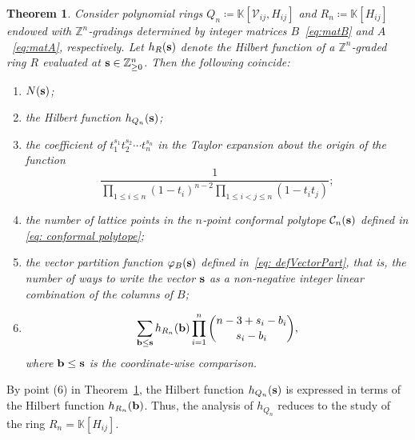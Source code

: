 \documentclass[12pt,a4paper]{extarticle}
\newtheorem{theorem}{Theorem}[section]
\theoremstyle{definition}
\newcommand{\K}{\mathbb{K}}
\begin{document}
\begin{theorem}\label{thm: main sec 3}
Consider polynomial rings
 $Q_n \coloneqq \K[\mathcal{V}_{ij}, H_{ij}]$ and $R_n \coloneqq \K[H_{ij}]$
endowed with $\mathbb{Z}^n$‑gradings determined by integer matrices $B$~\eqref{eq:matB} and $A$~\eqref{eq:matA}, respectively.
Let $h_R({\bf s})$ denote the Hilbert function of a $\mathbb{Z}^n$‑graded ring $R$ evaluated at
${\bf s}\in\mathbb{Z}_{\ge0}^n$.
Then the following coincide:
\begin{enumerate}
\item[(1)]
$N({\bf s})$;

\item[(2)]
the Hilbert function $h_{Q_n}({\bf s})$;

\item[(3)] the coefficient of $t_1^{s_1}t_2^{s_2}\cdots t_n^{s_n}$ in the Taylor expansion about the origin of the function
\begin{equation*}
\dfrac{1}{\prod\limits_{1\leq i\leq n}(1-t_i)^{n-2} \prod\limits_{1\leq i<j\leq n}(1-t_it_j)};    
\end{equation*}

\item[(4)]
the number of lattice points in the $n$‑point conformal polytope $\mathcal{C}_n({\bf s})$ defined in \eqref{eq: conformal polytope};

\item[(5)]
the vector partition function  
$
\varphi_B({\bf s})
$ defined in~\eqref{eq: defVectorPart},
that is, the number of ways to write the vector ${\bf s}$ as a non‑negative integer linear combination of the columns of $B$;

\item[(6)]
$$
\sum_{{\bf b}\le{\bf s}}
h_{R_n}({\bf b})
\prod_{i=1}^n
\binom{n-3+s_i-b_i}{s_i-b_i},
$$
where ${\bf b}\le{\bf s}$ is the coordinate-wise comparison.
\end{enumerate}
\end{theorem}
\noindent
By point (6) in Theorem~\ref{thm: main sec 3}, the Hilbert function $h_{Q_n}({\bf s})$ is expressed
in terms of the Hilbert function $h_{R_n}({\bf b})$. Thus, the analysis of
$h_{Q_n}$ reduces to the study of the ring $R_n=\K[H_{ij}]$.
\end{document}
